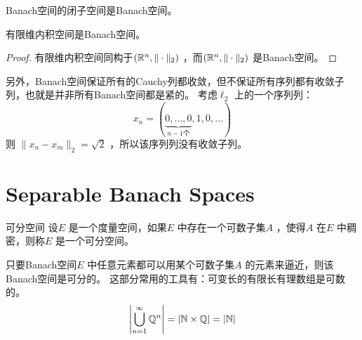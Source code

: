 \begin{theorem}{}
    Banach空间的闭子空间是Banach空间。
\end{theorem}

\begin{theorem}{}
    有限维内积空间是Banach空间。
\end{theorem}

\begin{proof}
    有限维内积空间同构于\((\mathbb{R}^{n} , \|\cdot\|_{2})\) ，而\((\mathbb{R}^{n} ,
    \|\cdot\|_{2})\) 是Banach空间。
\end{proof}

另外，Banach空间保证所有的Cauchy列都收敛，但不保证所有序列都有收敛子列，也就是并非所有Banach空间都是紧的。
考虑\(\ell_{2}\) 上的一个序列列：
\[
    x_{n} = (\underbrace{0,\ldots,0}_{n-1\text{个}} ,1,0,\ldots )
\]
则  \(\|x_{n}-x_{m}\|_{2} = \sqrt{2}\) ，所以该序列列没有收敛子列。

\section{Separable Banach Spaces}
\begin{definition}{可分空间}
    设\(E\) 是一个度量空间，如果\(E\) 中存在一个可数子集\(A\) ，使得\(A\) 在\(E\) 中稠密，则称\(E\) 是一个可分空间。
\end{definition}

只要Banach空间\(E\) 中任意元素都可以用某个可数子集\(A\) 的元素来逼近，则该Banach空间是可分的。
这部分常用的工具有：可变长的有限长有理数组是可数的。\[
    \left|\bigcup_{n=1}^{\infty} \mathbb{Q}^{n}\right| = \left|\mathbb{N}
    \times \mathbb{Q}\right| = \left|\mathbb{N}\right|
\]

